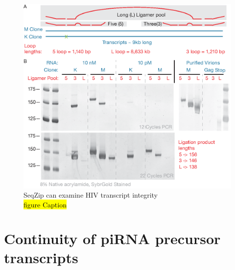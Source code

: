 \begin{figure}[htbp]
	\centering 
	\includegraphics{Figures/Chapter2/HIVviaSeqZip.eps}
	\caption[SeqZip can examine HIV transcript integrity]
	{
		SeqZip can examine HIV transcript integrity\\
		\hl{figure Caption}
	}
	\label{fig:Hiv tx via SeqZip}
\end{figure}

\section{Continuity of piRNA precursor transcripts}\label{sec: precursor TX}

